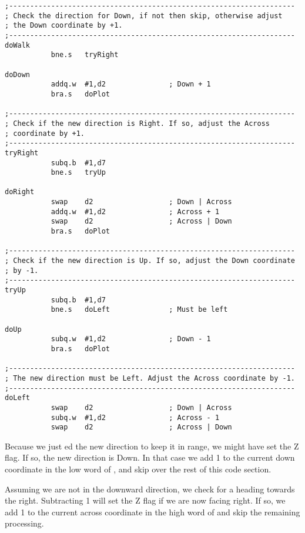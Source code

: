 \begin{lstlisting}[firstnumber=last,caption={Langtons Ant - Walk On}]
;--------------------------------------------------------------------
; Check the direction for Down, if not then skip, otherwise adjust
; the Down coordinate by +1.
;--------------------------------------------------------------------
doWalk
           bne.s   tryRight

doDown
           addq.w  #1,d2               ; Down + 1
           bra.s   doPlot

;--------------------------------------------------------------------
; Check if the new direction is Right. If so, adjust the Across 
; coordinate by +1.
;--------------------------------------------------------------------
tryRight
           subq.b  #1,d7
           bne.s   tryUp

doRight
           swap    d2                  ; Down | Across
           addq.w  #1,d2               ; Across + 1
           swap    d2                  ; Across | Down
           bra.s   doPlot

;--------------------------------------------------------------------
; Check if the new direction is Up. If so, adjust the Down coordinate
; by -1.
;--------------------------------------------------------------------
tryUp
           subq.b  #1,d7
           bne.s   doLeft              ; Must be left

doUp
           subq.w  #1,d2               ; Down - 1
           bra.s   doPlot

;--------------------------------------------------------------------
; The new direction must be Left. Adjust the Across coordinate by -1.
;--------------------------------------------------------------------
doLeft
           swap    d2                  ; Down | Across
           subq.w  #1,d2               ; Across - 1
           swap    d2                  ; Across | Down

\end{lstlisting}

Because we just ed the new direction to keep it in range, we might have set the Z flag. If so, the new direction is Down. In that case we add 1 to the current down coordinate in the low word of , and skip over the rest of this code section.

Assuming we are not in the downward direction, we check for a heading towards the right. Subtracting 1 will set the Z flag if we are now facing right. If so, we add 1 to the current across coordinate in the high word of  and skip the remaining processing.

